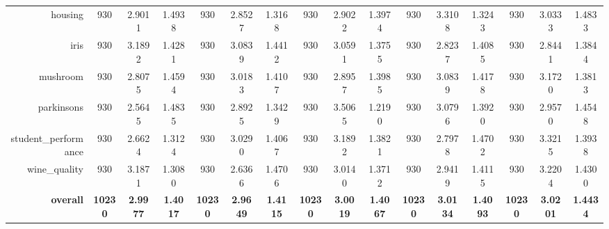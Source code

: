 \begin{table}[htbp]
{\begin{tabular}{rccccccccccccccc}
    housing & 930   & 2.9011 & 1.4938 & 930   & \cellcolor[rgb]{ .776,  .937,  .808}\textcolor[rgb]{ 0,  .38,  0}{2.8527} & 1.3168 & 930   & 2.9022 & 1.3974 & 930   & 3.3108 & 1.3243 & 930   & 3.0333 & 1.4833 \\
    iris  & 930   & 3.1892 & 1.4281 & 930   & 3.0839 & 1.4412 & 930   & 3.0591 & 1.3755 & 930   & \cellcolor[rgb]{ .776,  .937,  .808}\textcolor[rgb]{ 0,  .38,  0}{2.8237} & 1.4085 & 930   & 2.8441 & 1.3844 \\
    mushroom & 930   & \cellcolor[rgb]{ .776,  .937,  .808}\textcolor[rgb]{ 0,  .38,  0}{2.8075} & 1.4594 & 930   & 3.0183 & 1.4107 & 930   & 2.8957 & 1.3985 & 930   & 3.0839 & 1.4178 & 930   & 3.1720 & 1.3813 \\
    parkinsons & 930   & \cellcolor[rgb]{ .776,  .937,  .808}\textcolor[rgb]{ 0,  .38,  0}{2.5645} & 1.4835 & 930   & 2.8925 & 1.3429 & 930   & 3.5065 & 1.2190 & 930   & 3.0796 & 1.3920 & 930   & 2.9570 & 1.4548 \\
    student\_performance & 930   & \cellcolor[rgb]{ .776,  .937,  .808}\textcolor[rgb]{ 0,  .38,  0}{2.6624} & 1.3124 & 930   & 3.0290 & 1.4067 & 930   & 3.1892 & 1.3821 & 930   & 2.7978 & 1.4702 & 930   & 3.3215 & 1.3938 \\
    wine\_quality & 930   & 3.1871 & 1.3080 & 930   & \cellcolor[rgb]{ .776,  .937,  .808}\textcolor[rgb]{ 0,  .38,  0}{2.6366} & 1.4706 & 930   & 3.0140 & 1.3712 & 930   & 2.9419 & 1.4115 & 930   & 3.2204 & 1.4300 \\
    \midrule
    \textbf{overall} & \textbf{10230} & \textbf{2.9977} & \textbf{1.4017} & \textbf{10230} & \cellcolor[rgb]{ .776,  .937,  .808}\textcolor[rgb]{ 0,  .38,  0}{\textbf{2.9649}} & \textbf{1.4115} & \textbf{10230} & \textbf{3.0019} & \textbf{1.4067} & \textbf{10230} & \textbf{3.0134} & \textbf{1.4093} & \textbf{10230} & \textbf{3.0201} & \textbf{1.4434} \\
    \end{tabular}%
    }
 \label{tab:results:bhh_burn_in_credit}%
\end{table}%

